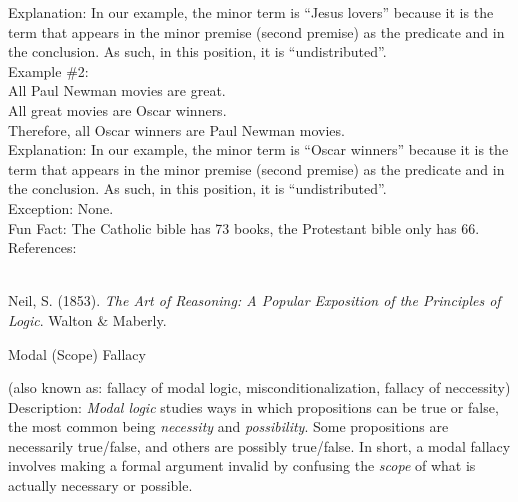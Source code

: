 \documentclass[a4paper,12pt,single,pdftex]{scrartcl}
\begin{document}
    
      Explanation: In our example, the minor term is “Jesus lovers” because it is the term that appears in the minor premise (second premise) as the predicate and in the conclusion.  As such, in this position, it is “undistributed”.
    \\

    
      Example \#2:
    \\

    
      All Paul Newman movies are great.
    \\

    
      All great movies are Oscar winners.
    \\

    
      Therefore, all Oscar winners are Paul Newman movies.
    \\

    
      Explanation: In our example, the minor term is “Oscar winners” because it is the term that appears in the minor premise (second premise) as the predicate and in the conclusion.  As such, in this position, it is “undistributed”.
    \\

    
      Exception: None.
    \\

    
      Fun Fact: The Catholic bible has 73 books, the Protestant bible only has 66.
    \\

    References:

    
      
        
      \\

      
        
          Neil, S. (1853). {\it The Art of Reasoning: A Popular Exposition of the Principles of Logic}. Walton \& Maberly.
        
      
    
  

Modal (Scope) Fallacy
    
      (also known as: fallacy of modal logic, misconditionalization, fallacy of neccessity)
    \\

  
    Description: {\it Modal logic} studies ways in which propositions can be true or false, the most common being {\it necessity} and {\it possibility}.  Some propositions are necessarily true/false, and others are possibly true/false.  In short, a modal fallacy involves making a formal argument invalid by confusing the {\it scope} of what is actually necessary or possible.
\end{document}
